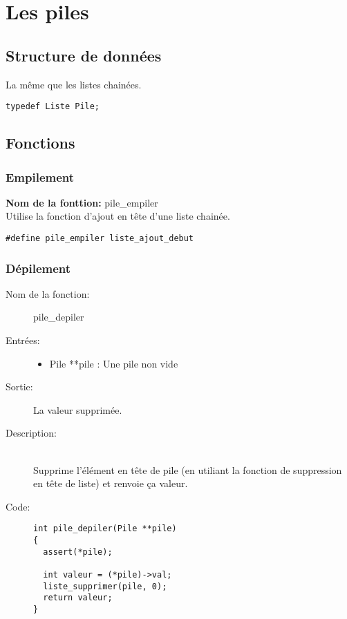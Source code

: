 \documentclass[a4paper]{article}
\begin{document}
\section{Les piles}
\subsection{Structure de données}
La même que les listes chainées.

\begin{lstlisting}
typedef Liste Pile;
\end{lstlisting}

\subsection{Fonctions}
\subsubsection{Empilement}
\textbf{Nom de la fonttion:} pile\_empiler \\

Utilise la fonction d'ajout en tête d'une liste chainée.
\begin{lstlisting}
#define pile_empiler liste_ajout_debut
\end{lstlisting}

\subsubsection{Dépilement}
\begin{description}
  \item[Nom de la fonction:] pile\_depiler

  \item[Entrées:] \hfill
    \begin{itemize}
      \item Pile **pile : Une pile non vide
    \end{itemize}

  \item[Sortie:] \hfill
    La valeur supprimée.

  \item[Description:] \hfill \\ 
    Supprime l'élément en tête de pile (en utiliant la fonction de suppression en tête de liste)
    et renvoie ça valeur.

  \item[Code:] \hfill
  \begin{lstlisting}
int pile_depiler(Pile **pile)
{
  assert(*pile);

  int valeur = (*pile)->val;
  liste_supprimer(pile, 0);
  return valeur;
}
  \end{lstlisting}
\end{description}
\end{document}
